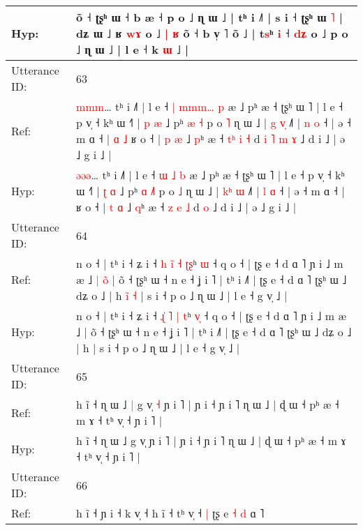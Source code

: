 \documentclass[10pt]{article}
\DeclareRobustCommand{\hl}[1]{{\textcolor{red}{#1}}}
\begin{document}
\begin{longtable}{ll}
 \\
Hyp: & õ ˧ ʈʂʰ ɯ ˧ b æ ˧ p o ˩ ɳ ɯ ˩ | tʰ i ˩˥ | s i ˧ ʈʂʰ ɯ \hl{˥} | dʑ ɯ ˩ ʁ\hl{ }\hl{w}\hl{ɤ} o ˩\hl{ }\hl{|} \hl{ʁ} õ ˧ b v̩ ˥ õ ˩\hl{}\hl{}\hl{}\hl{}\hl{}\hl{} | t\hl{s}ʰ \hl{i} ˧ \hl{d}\hl{ʑ} o ˩ p o ˩ ɳ ɯ ˩ | l e ˧ k \hl{ɯ} ˩ |
 \\
\midrule
Utterance ID: & 63 \\
Ref: & \hl{m}\hl{m}\hl{m}… tʰ i ˩˥ | l e ˧ \hl{|} \hl{m}\hl{m}\hl{m}\hl{…} \hl{p} æ ˩ pʰ æ ˧ ʈʂʰ ɯ ˥ | l e ˧ p v̩ ˧ kʰ ɯ ˧˥ | \hl{p} \hl{æ} ˩ pʰ \hl{æ} \hl{}\hl{˧} p o \hl{˥} ɳ ɯ ˩ | \hl{g}\hl{ }\hl{v}\hl{̩} ˩˥ | \hl{n} \hl{o} ˧ | ə ˧ m ɑ ˧ |\hl{ }\hl{ɑ}\hl{ }\hl{˩} ʁ o ˧ | \hl{p} \hl{æ} ˩ \hl{p}ʰ æ ˧ \hl{t}\hl{ʰ} \hl{i} \hl{˧} d\hl{ }\hl{i}\hl{ }\hl{˥}\hl{ }\hl{m} \hl{ɤ} ˩ d i ˩ | ə ˩ g i ˩ |
 \\
Hyp: & \hl{ə}\hl{ə}\hl{ə}… tʰ i ˩˥ | l e ˧ \hl{ɯ} \hl{}\hl{}\hl{}\hl{˩} \hl{b} æ ˩ pʰ æ ˧ ʈʂʰ ɯ ˥ | l e ˧ p v̩ ˧ kʰ ɯ ˧˥ | \hl{ʈ} \hl{ɑ} ˩ pʰ \hl{ɑ} \hl{˩}\hl{˥} p o \hl{˩} ɳ ɯ ˩ | \hl{k}\hl{ʰ}\hl{ }\hl{ɯ} ˩˥ | \hl{l} \hl{ɑ} ˧ | ə ˧ m ɑ ˧ |\hl{}\hl{}\hl{}\hl{} ʁ o ˧ | \hl{t} \hl{ɑ} ˩ \hl{q}ʰ æ ˧ \hl{}\hl{z} \hl{e} \hl{˩} d\hl{}\hl{}\hl{}\hl{}\hl{}\hl{} \hl{o} ˩ d i ˩ | ə ˩ g i ˩ |
 \\
\midrule
Utterance ID: & 64 \\
Ref: & n o ˧ | tʰ i ˧ ʑ i ˧ \hl{h}\hl{ }\hl{i}\hl{̃} \hl{˧} \hl{ʈ}\hl{ʂ}ʰ \hl{}\hl{ɯ} ˧ q o ˧ | ʈʂ e ˧ d ɑ ˥ ɲ i ˩ m æ ˩\hl{ }\hl{|}\hl{ }\hl{o}\hl{̃} | õ ˧ ʈʂʰ ɯ ˧ n e ˧ ʝ i ˥ | tʰ i ˩˥ | ʈʂ e ˧ d ɑ ˥ ʈʂʰ ɯ ˩ dʑ o ˩ | h\hl{ }\hl{i}\hl{̃}\hl{ }\hl{˧} | s i ˧ p o ˩ ɳ ɯ ˩ | l e ˧ g v̩ ˩ |
 \\
Hyp: & n o ˧ | tʰ i ˧ ʑ i ˧ \hl{ɻ}\hl{̍}\hl{ }\hl{˥} \hl{|} \hl{}\hl{t}ʰ \hl{v}\hl{̩} ˧ q o ˧ | ʈʂ e ˧ d ɑ ˥ ɲ i ˩ m æ ˩\hl{}\hl{}\hl{}\hl{}\hl{} | õ ˧ ʈʂʰ ɯ ˧ n e ˧ ʝ i ˥ | tʰ i ˩˥ | ʈʂ e ˧ d ɑ ˥ ʈʂʰ ɯ ˩ dʑ o ˩ | h\hl{}\hl{}\hl{}\hl{}\hl{} | s i ˧ p o ˩ ɳ ɯ ˩ | l e ˧ g v̩ ˩ |
 \\
\midrule
Utterance ID: & 65 \\
Ref: & h ĩ ˧ ɳ ɯ ˩\hl{ }\hl{|} g v̩\hl{ }\hl{˧} ɲ i ˥ | ɲ i ˧ ɲ i ˥ ɳ ɯ ˩ | ɖ ɯ ˧ pʰ æ ˧ m ɤ ˧ tʰ v̩ ˧ ɲ i ˥ |
 \\
Hyp: & h ĩ ˧ ɳ ɯ ˩\hl{}\hl{} g v̩\hl{}\hl{} ɲ i ˥ | ɲ i ˧ ɲ i ˥ ɳ ɯ ˩ | ɖ ɯ ˧ pʰ æ ˧ m ɤ ˧ tʰ v̩ ˧ ɲ i ˥ |
 \\
\midrule
Utterance ID: & 66 \\
Ref: & h ĩ\hl{}\hl{}\hl{}\hl{}\hl{}\hl{} ˧\hl{}\hl{} ɲ i ˧ k v̩ ˧ h ĩ ˧ tʰ v̩ ˧\hl{ }\hl{|} ʈʂ e\hl{}\hl{} \hl{˧} \hl{}\hl{d} ɑ \hl{}˥\hl{}\hl{}
 \\

\end{longtable}
\end{document}
